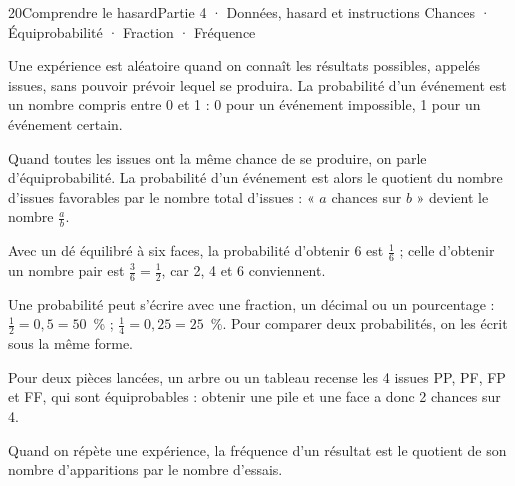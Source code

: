 \begin{ouverture}[probabilites]{20}{Comprendre le hasard}{Partie 4 · Données, hasard et instructions}
{Chances · Équiprobabilité · Fraction · Fréquence}
\end{ouverture}
\pagestyle{otMain}\essentiel\fontsize{11}{15}\selectfont
{}\label{cours-20-1}
\begin{definition}Une expérience est aléatoire quand on connaît les résultats possibles, appelés issues, sans pouvoir prévoir lequel se produira. La probabilité d’un événement est un nombre compris entre 0 et 1 : 0 pour un événement impossible, 1 pour un événement certain.\end{definition}
\label{fig-cours-20-1-cours-echelle-proba}

\begin{propriete}Quand toutes les issues ont la même chance de se produire, on parle d’équiprobabilité. La probabilité d’un événement est alors le quotient du nombre d’issues favorables par le nombre total d’issues : « $a$ chances sur $b$ » devient le nombre $\frac ab$.\end{propriete}
\begin{exemple}Avec un dé équilibré à six faces, la probabilité d’obtenir 6 est $\frac16$ ; celle d’obtenir un nombre pair est $\frac36=\frac12$, car 2, 4 et 6 conviennent.\end{exemple}
\clearpage
{}\label{cours-20-2}
\begin{savoirfaire}Une probabilité peut s’écrire avec une fraction, un décimal ou un pourcentage : $\frac12=0{,}5=50$~\% ; $\frac14=0{,}25=25$~\%. Pour comparer deux probabilités, on les écrit sous la même forme.\end{savoirfaire}
\begin{savoirfaire}Pour deux pièces lancées, un arbre ou un tableau recense les 4 issues PP, PF, FP et FF, qui sont équiprobables : obtenir une pile et une face a donc 2 chances sur 4.\end{savoirfaire}
\begin{definition}Quand on répète une expérience, la fréquence d’un résultat est le quotient de son nombre d’apparitions par le nombre d’essais.\end{definition}
\label{fig-cours-20-2-cours-frequences}

